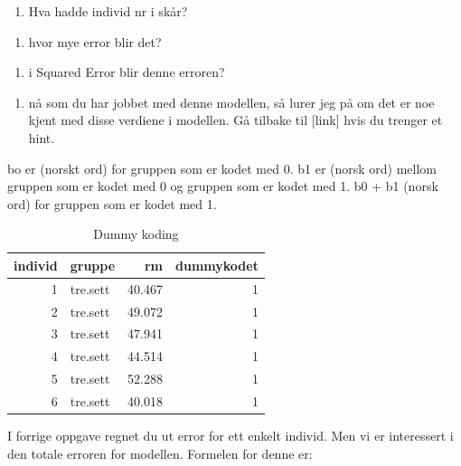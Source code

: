 \documentclass[
]{book}
\providecommand{\tightlist}{%
  \setlength{\itemsep}{0pt}\setlength{\parskip}{0pt}}
\begin{document}
\begin{enumerate}
\def\labelenumi{\alph{enumi})}
\setcounter{enumi}{1}
\tightlist
\item
  Hva hadde individ nr i skår?
\end{enumerate}

\begin{enumerate}
\def\labelenumi{\alph{enumi})}
\setcounter{enumi}{2}
\tightlist
\item
  hvor mye error blir det?
\end{enumerate}

\begin{enumerate}
\def\labelenumi{\alph{enumi})}
\setcounter{enumi}{3}
\tightlist
\item
  i Squared Error blir denne erroren?
\end{enumerate}

\begin{enumerate}
\def\labelenumi{\alph{enumi})}
\setcounter{enumi}{4}
\tightlist
\item
  nå som du har jobbet med denne modellen, så lurer jeg på om det er noe kjent med disse verdiene i modellen. Gå tilbake til {[}link{]} hvis du trenger et hint.
\end{enumerate}

bo er (norskt ord) for gruppen som er kodet med 0. b1 er (norsk ord) mellom gruppen som er kodet med 0 og gruppen som er kodet med 1. b0 + b1 (norsk ord) for gruppen som er kodet med 1.

\begin{table}

\caption{\label{tab:unnamed-chunk-11}Dummy koding}
\centering
\begin{tabular}[t]{r|l|r|r}
\hline
individ & gruppe & rm & dummykodet\\
\hline
1 & tre.sett & 40.467 & 1\\
\hline
2 & tre.sett & 49.072 & 1\\
\hline
3 & tre.sett & 47.941 & 1\\
\hline
4 & tre.sett & 44.514 & 1\\
\hline
5 & tre.sett & 52.288 & 1\\
\hline
6 & tre.sett & 40.018 & 1\\
\hline
\end{tabular}
\end{table}

I forrige oppgave regnet du ut error for ett enkelt individ. Men vi er interessert i den totale erroren for modellen. Formelen for denne er:
\end{document}
